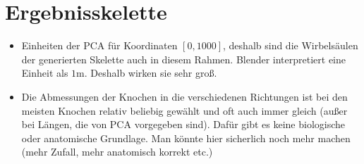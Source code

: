 \section{Ergebnisskelette}

\begin{itemize}
 \item Einheiten der PCA für Koordinaten $[0, 1000]$, deshalb sind die Wirbelsäulen der generierten Skelette auch in diesem Rahmen. Blender interpretiert eine Einheit als $1$m. Deshalb wirken sie sehr groß.
 
 \item Die Abmessungen der Knochen in die verschiedenen Richtungen ist bei den meisten Knochen relativ beliebig gewählt und oft auch immer gleich (außer bei Längen, die von PCA vorgegeben sind). Dafür gibt es keine biologische oder anatomische Grundlage. Man könnte hier sicherlich noch mehr machen (mehr Zufall, mehr anatomisch korrekt etc.)
\end{itemize}


